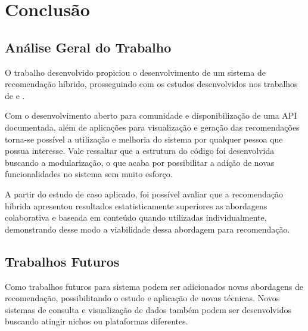 \chapter{\textbf{Conclusão}} %

\section{Análise Geral do Trabalho}

O trabalho desenvolvido propiciou o desenvolvimento de um sistema de recomendação híbrido, prosseguindo com os estudos desenvolvidos nos trabalhos de  e .

Com o desenvolvimento aberto para comunidade e disponibilização de uma API documentada, além de aplicações para visualização e geração das recomendações torna-se possível a utilização e melhoria do sistema por qualquer pessoa que possua interesse. Vale ressaltar que a estrutura do código foi desenvolvida buscando a modularização, o que acaba por possibilitar a adição de novas funcionalidades no sistema sem muito esforço.

A partir do estudo de caso aplicado, foi possível avaliar que a recomendação híbrida apresentou resultados estatisticamente superiores as abordagens colaborativa e baseada em conteúdo quando utilizadas individualmente, demonstrando desse modo a viabilidade dessa abordagem para recomendação.

\section{Trabalhos Futuros}

Como trabalhos futuros para sistema podem ser adicionados novas abordagens de recomendação, possibilitando o estudo e aplicação de novas técnicas. Novos sistemas de consulta e visualização de dados também podem ser desenvolvidos buscando atingir nichos ou plataformas diferentes.